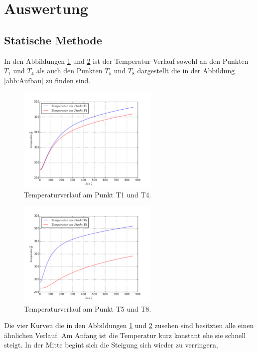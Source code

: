 \section{Auswertung}
\label{sec:Auswertung}
\subsection{Statische Methode}

In den Abbildungen \ref{abb:T1T4} und \ref{abb:T5T8} ist der
Temperatur Verlauf sowohl an den Punkten $T_1$ und $T_4$ als
auch den Punkten $T_5$ und $T_8$ dargestellt die in der Abbildung
\ref{abb:Aufbau} zu finden sind.
\begin{figure}
  \centering
  \includegraphics[width=0.6\textwidth]{plotT1T4.pdf}
  \caption{Temperaturverlauf am Punkt T1 und T4.}
  \label{abb:T1T4}
  \end{figure}
\begin{figure}
    \centering
    \includegraphics[width=0.6\textwidth]{plotT5T8.pdf}
    \caption{Temperaturverlauf am Punkt T5 und T8.}
    \label{abb:T5T8}
\end{figure}
\FloatBarrier
Die vier Kurven die in den
Abbildungen \ref{abb:T1T4} und \ref{abb:T5T8}
zusehen sind besitzten alle einen ähnlichen Verlauf.
Am Anfang ist die Temperatur kurz konstant
ehe sie schnell steigt. In der Mitte begint
sich die Steigung sich wieder zu verringern,
